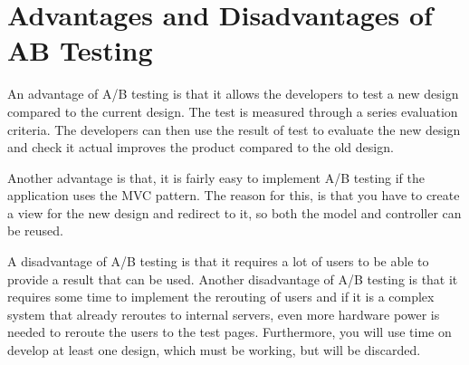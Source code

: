 \section{Advantages and Disadvantages of AB Testing}
An advantage of A/B testing is that it allows the developers to test a new design compared to the current design. The test is measured through a series evaluation criteria. The developers can then use the result of test to evaluate the new design and check it actual improves the product compared to the old design.

Another advantage is that, it is fairly easy to implement A/B testing if the application uses the MVC pattern. The reason for this, is that you have to create a view for the new design and redirect to it, so both the model and controller can be reused.

A disadvantage of A/B testing is that it requires a lot of users to be able to provide a result that can be used. Another disadvantage of A/B testing is that it requires some time to implement the rerouting of users and if it is a complex system that already reroutes to internal servers, even more hardware power is needed to reroute the users to the test pages. Furthermore, you will use time on develop at least one design, which must be working, but will be discarded.